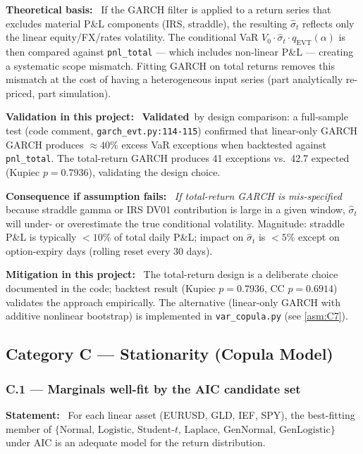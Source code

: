 \documentclass[11pt,a4paper]{article}
\newcommand{\asmfield}[1]{\medskip\noindent\textbf{#1:}\ }
\newcommand{\code}[1]{\texttt{#1}}
\newcommand{\validated}{\textbf{Validated}}
\begin{document}
\asmfield{Theoretical basis}
If the GARCH filter is applied to a return series that excludes material
P\&L components (IRS, straddle), the resulting $\hat{\sigma}_t$ reflects
only the linear equity/FX/rates volatility.  The conditional VaR
$V_0 \cdot \hat{\sigma}_t \cdot q_{\mathrm{EVT}}(\alpha)$ is then
compared against \code{pnl\_total} --- which includes non-linear P\&L ---
creating a systematic scope mismatch.  Fitting GARCH on total returns
removes this mismatch at the cost of having a heterogeneous input series
(part analytically re-priced, part simulation).

\asmfield{Validation in this project}
\validated\ by design comparison: a full-sample test (code comment,
\code{garch\_evt.py:114-115}) confirmed that linear-only GARCH GARCH
produces $\approx 40\%$ excess VaR exceptions when backtested against
\code{pnl\_total}.  The total-return GARCH produces 41 exceptions vs.\
42.7 expected (Kupiec $p = 0.7936$), validating the design choice.

\asmfield{Consequence if assumption fails}
\emph{If total-return GARCH is mis-specified} because straddle gamma or
IRS DV01 contribution is large in a given window, $\hat{\sigma}_t$ will
under- or overestimate the true conditional volatility.  Magnitude:
straddle P\&L is typically $< 10\%$ of total daily P\&L; impact on
$\hat{\sigma}_t$ is $< 5\%$ except on option-expiry days (rolling reset
every 30 days).

\asmfield{Mitigation in this project}
The total-return design is a deliberate choice documented in the code;
backtest result (Kupiec $p = 0.7936$, CC $p = 0.6914$) validates the
approach empirically.  The alternative (linear-only GARCH with additive
nonlinear bootstrap) is implemented in \code{var\_copula.py} (see
\cref{asm:C7}).

\subsection{Category C --- Stationarity (Copula Model)}\label{sec:catC}

\subsubsection{C.1 --- Marginals well-fit by the AIC candidate set}\label{asm:C1}

\asmfield{Statement}
For each linear asset (EURUSD, GLD, IEF, SPY), the best-fitting member of
$\{\text{Normal, Logistic, Student-}t\text{, Laplace, GenNormal,
GenLogistic}\}$ under AIC is an adequate model for the return distribution.
\end{document}
